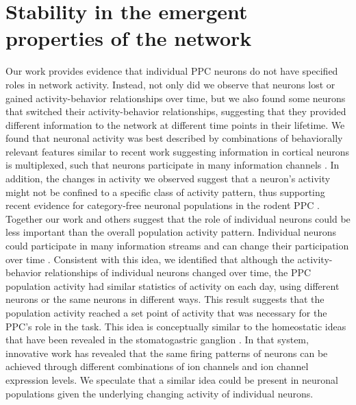 \section{Stability in the emergent properties of the network} \label{discussion:emergent_prop}

Our work provides evidence that individual PPC neurons do not have specified roles in network activity. Instead, not only did we observe that neurons lost or gained activity-behavior relationships over time, but we also found some neurons that switched their activity-behavior relationships, suggesting that they provided different information to the network at different time points in their lifetime. We found that neuronal activity was best described by combinations of behaviorally relevant features similar to recent work suggesting information in cortical neurons is multiplexed, such that neurons participate in many information channels \citep{Cromer2010, Rigotti2013}. In addition, the changes in activity we observed suggest that a neuron's activity might not be confined to a specific class of activity pattern, thus supporting recent evidence for category-free neuronal populations in the rodent PPC \citep{Raposo2014}. Together our work and others suggest that the role of individual neurons could be less important than the overall population activity pattern. Individual neurons could participate in many information streams and can change their participation over time \citep{Yuste2015}. Consistent with this idea, we identified that although the activity-behavior relationships of individual neurons changed over time, the PPC population activity had similar statistics of activity on each day, using different neurons or the same neurons in different ways. This result suggests that the population activity reached a set point of activity that was necessary for the PPC's role in the task. This idea is conceptually similar to the homeostatic ideas that have been revealed in the stomatogastric ganglion \citep{Marder2011, OLeary2014, Prinz2004}. In that system, innovative work has revealed that the same firing patterns of neurons can be achieved through different combinations of ion channels and ion channel expression levels. We speculate that a similar idea could be present in neuronal populations given the underlying changing activity of individual neurons.